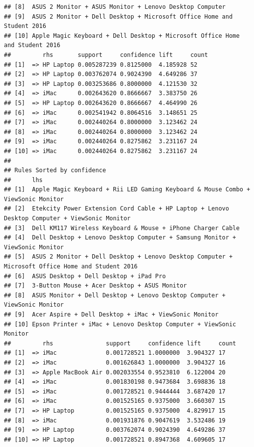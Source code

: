 \documentclass[]{article}
\begin{document}
\begin{verbatim}
## [8]  ASUS 2 Monitor + ASUS Monitor + Lenovo Desktop Computer                     
## [9]  ASUS 2 Monitor + Dell Desktop + Microsoft Office Home and Student 2016      
## [10] Apple Magic Keyboard + Dell Desktop + Microsoft Office Home and Student 2016
##         rhs       support     confidence lift     count
## [1]  => HP Laptop 0.005287239 0.8125000  4.185928 52   
## [2]  => HP Laptop 0.003762074 0.9024390  4.649286 37   
## [3]  => HP Laptop 0.003253686 0.8000000  4.121530 32   
## [4]  => iMac      0.002643620 0.8666667  3.383750 26   
## [5]  => HP Laptop 0.002643620 0.8666667  4.464990 26   
## [6]  => iMac      0.002541942 0.8064516  3.148651 25   
## [7]  => iMac      0.002440264 0.8000000  3.123462 24   
## [8]  => iMac      0.002440264 0.8000000  3.123462 24   
## [9]  => iMac      0.002440264 0.8275862  3.231167 24   
## [10] => iMac      0.002440264 0.8275862  3.231167 24   
## 
## Rules Sorted by confidence 
##      lhs                                                                                             
## [1]  Apple Magic Keyboard + Rii LED Gaming Keyboard & Mouse Combo + ViewSonic Monitor                
## [2]  Etekcity Power Extension Cord Cable + HP Laptop + Lenovo Desktop Computer + ViewSonic Monitor   
## [3]  Dell KM117 Wireless Keyboard & Mouse + iPhone Charger Cable                                     
## [4]  Dell Desktop + Lenovo Desktop Computer + Samsung Monitor + ViewSonic Monitor                    
## [5]  ASUS 2 Monitor + Dell Desktop + Lenovo Desktop Computer + Microsoft Office Home and Student 2016
## [6]  ASUS Desktop + Dell Desktop + iPad Pro                                                          
## [7]  3-Button Mouse + Acer Desktop + ASUS Monitor                                                    
## [8]  ASUS Monitor + Dell Desktop + Lenovo Desktop Computer + ViewSonic Monitor                       
## [9]  Acer Aspire + Dell Desktop + iMac + ViewSonic Monitor                                           
## [10] Epson Printer + iMac + Lenovo Desktop Computer + ViewSonic Monitor                              
##         rhs               support     confidence lift     count
## [1]  => iMac              0.001728521 1.0000000  3.904327 17   
## [2]  => iMac              0.001626843 1.0000000  3.904327 16   
## [3]  => Apple MacBook Air 0.002033554 0.9523810  6.122004 20   
## [4]  => iMac              0.001830198 0.9473684  3.698836 18   
## [5]  => iMac              0.001728521 0.9444444  3.687420 17   
## [6]  => iMac              0.001525165 0.9375000  3.660307 15   
## [7]  => HP Laptop         0.001525165 0.9375000  4.829917 15   
## [8]  => iMac              0.001931876 0.9047619  3.532486 19   
## [9]  => HP Laptop         0.003762074 0.9024390  4.649286 37   
## [10] => HP Laptop         0.001728521 0.8947368  4.609605 17
\end{verbatim}
\end{document}
